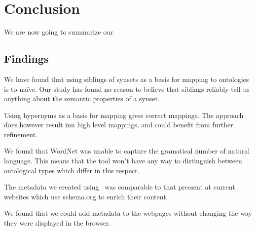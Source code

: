 
\chapter{Conclusion} %
\label{Conclusion} %
We are now going to summarize our

\section{Findings}

We have found that using siblings of synsets as a basis for mapping to ontologies is to naïve.
Our study has found no reason to believe that siblings reliably tell us anything about the semantic properties of a synset.

Using hypernyms as a basis for mapping gives correct mappings.
The approach does however result inn high level mappings, and could benefit from further refinement.

We found that WordNet was unable to capture the gramatical number of natural language.
This means that the tool won't have any way to distinguish between ontological types which differ in this respect.

The metadata we created using \theartefact\ was comparable to that pressent at current websites which use schema.org to
enrich their content.

We found that we could add metadata to the webpages without changing the way they were displayed in the browser.

